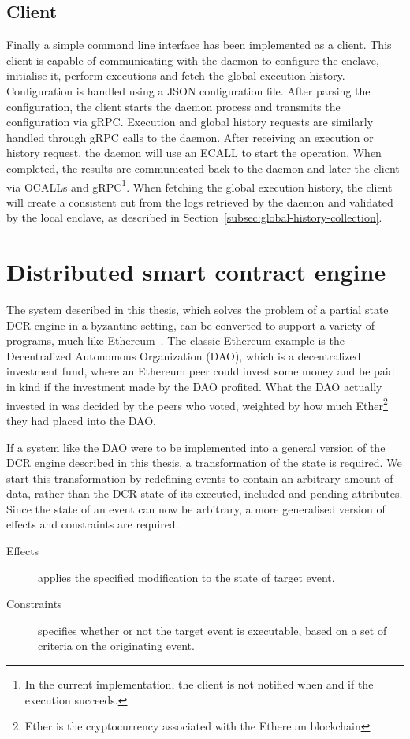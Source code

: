 \documentclass{article}
\begin{document}
	\subsection*{Client}

	Finally a simple command line interface has been implemented as a client.
	This client is capable of communicating with the daemon to configure the enclave, initialise it, perform executions and fetch the global execution history.
	Configuration is handled using a JSON configuration file.
	After parsing the configuration, the client starts the daemon process and transmits the configuration via gRPC.
	Execution and global history requests are similarly handled through gRPC calls to the daemon.
	After receiving an execution or history request, the daemon will use an ECALL to start the operation.
	When completed, the results are communicated back to the daemon and later the client via OCALLs and gRPC\footnote{In the current implementation, the client is not notified when and if the execution succeeds.}.
	When fetching the global execution history, the client will create a consistent cut from the logs retrieved by the daemon and validated by the local enclave, as described in Section~\ref{subsec:global-history-collection}.

	\section{Distributed smart contract engine}

	The system described in this thesis, which solves the problem of a partial state DCR engine in a byzantine setting, can be converted to support a variety of programs, much like Ethereum~\cite{_ethereum_2018}.
	The classic Ethereum example is the Decentralized Autonomous Organization (DAO), which is a decentralized investment fund, where an Ethereum peer could invest some money and be paid in kind if the investment made by the DAO profited.
	What the DAO actually invested in was decided by the peers who voted, weighted by how much Ether\footnote{Ether is the cryptocurrency associated with the Ethereum blockchain} they had placed into the DAO.

	If a system like the DAO were to be implemented into a general version of the DCR engine described in this thesis, a transformation of the state is required.
	We start this transformation by redefining events to contain an arbitrary amount of data, rather than the DCR state of its executed, included and pending attributes.
	Since the state of an event can now be arbitrary, a more generalised version of effects and constraints are required.
	\begin{description}
		\item[Effects] applies the specified modification to the state of target event.
		\item[Constraints] specifies whether or not the target event is executable, based on a set of criteria on the originating event.
	\end{description}
\end{document}
